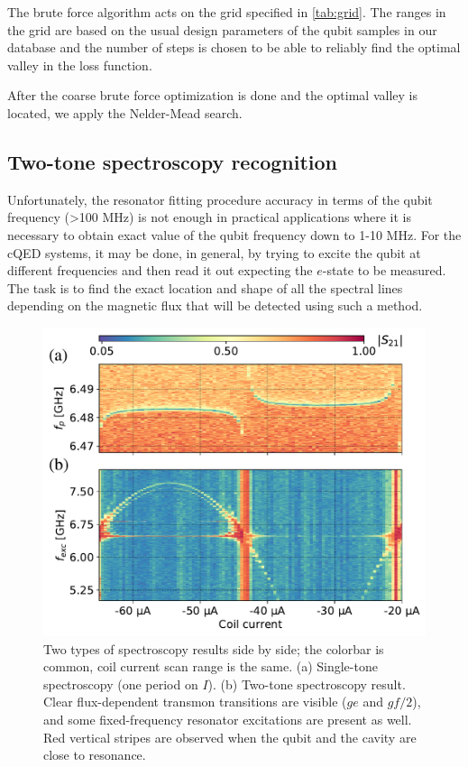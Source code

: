 \documentclass[%
 aip,
 amsmath,amssymb,
 reprint,%
]{revtex4-1}
\begin{document}
The brute force algorithm acts on the grid specified in \autoref{tab:grid}. The ranges in the grid are based on the usual design parameters of the qubit samples in our database and the number of steps is chosen to be able to reliably find the optimal valley in the loss function.

After the coarse brute force optimization is done and the optimal valley is located, we apply the Nelder-Mead search.


\subsection{Two-tone spectroscopy recognition}


Unfortunately, the resonator fitting procedure accuracy in terms of the qubit frequency (>100 MHz) is not enough in practical applications where it is necessary to obtain exact value of the qubit frequency down to 1-10 MHz. For the cQED systems, it may be done, in general, by trying to excite the qubit at different frequencies and then read it out expecting the $e$-state to be measured. The task is to find the exact location and shape of all the spectral lines depending on the magnetic flux that will be detected using such a method. 

\begin{figure}[b]
	\centering
	\includegraphics[width=\linewidth]{twotone}
	\caption{Two types of spectroscopy results side by side; the colorbar is common, coil current scan range is the same. (a) Single-tone spectroscopy (one period on $I$). (b) Two-tone spectroscopy result. Clear flux-dependent transmon transitions are visible ($ge$ and $gf/2$), and some fixed-frequency resonator excitations are present as well. Red vertical stripes are observed when the qubit and the cavity are close to resonance.}
	\label{fig:twotone}
\end{figure}
\end{document}
